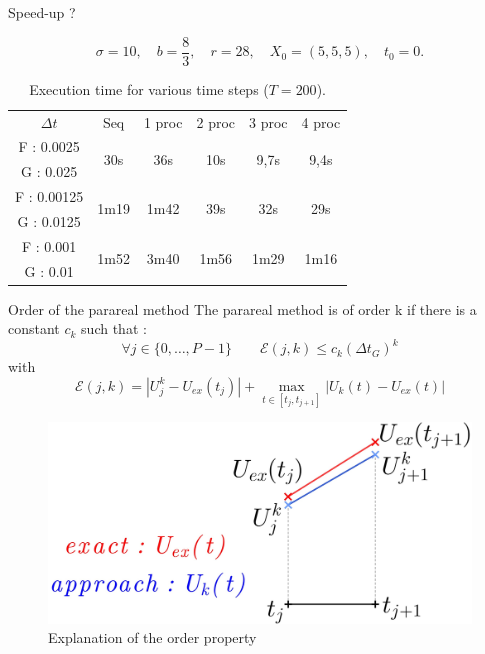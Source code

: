 \begin{frame}{Speed-up ?}
	
	$$\sigma=10, \quad b=\frac{8}{3}, \quad r=28, \quad X_0=(5,5,5), \quad t_0=0.$$
	\begin{table}[H]
		\centering
		\begin{tabular}{| c || c | c | c | c | c |}
			\hline
			\multirow{2}{1.5 cm}{$\Delta t$} & \multirow{2}{1.5 cm}{Seq} & \multirow{2}{1.5 cm}{1 proc} & \multirow{2}{1.5 cm}{2 proc} & \multirow{2}{1.5 cm}{3 proc} &\multirow{2}{1.5 cm}{4 proc} \\
			& & & & & \\
			\hline 
			F : 0.0025 & \multirow{2}{1.5 cm}{30s} & \multirow{2}{1.5 cm}{36s} & \multirow{2}{1.5 cm}{10s} & \multirow{2}{1.5 cm}{9,7s} & \multirow{2}{1.5 cm}{9,4s} \\
			G : 0.025 & & & & & \\
			\hline 
			F : 0.00125 & \multirow{2}{1.5 cm}{1m19} & \multirow{2}{1.5 cm}{1m42} & \multirow{2}{1.5 cm}{39s} & \multirow{2}{1.5 cm}{32s} & \multirow{2}{1.5 cm}{29s} \\
			G : 0.0125 & & & & & \\
			\hline 
			F : 0.001 & \multirow{2}{1.5 cm}{1m52} & \multirow{2}{1.5 cm}{3m40} & \multirow{2}{1.5 cm}{1m56} & \multirow{2}{1.5 cm}{1m29} & \multirow{2}{1.5 cm}{1m16} \\
			G : 0.01 & & & & & \\	 
			\hline
		\end{tabular}
		\caption{Execution time for various time steps ($T=200$).}
		\label{time}
	\end{table}
	
\end{frame}

\begin{frame}{Order of the parareal method}
	The parareal method is of order k if there is a constant $c_k$ such that :
	\begin{equation*}
		\forall j\in\{0,\dots,P-1\} \qquad \mathcal{E}(j,k)\le c_k(\Delta t_G)^k
	\end{equation*}
	with
	$$\mathcal{E}(j,k)=|U_j^k-U_{ex}(t_j)|+\max_{t\in[t_j,t_{j+1}]}|U_k(t)-U_{ex}(t)|$$
	\begin{figure}
		\centering
		\includegraphics[width=0.62\linewidth]{images/parareal/explane_order.jpg}
		\caption{Explanation of the order property}
	\end{figure}
\end{frame}


